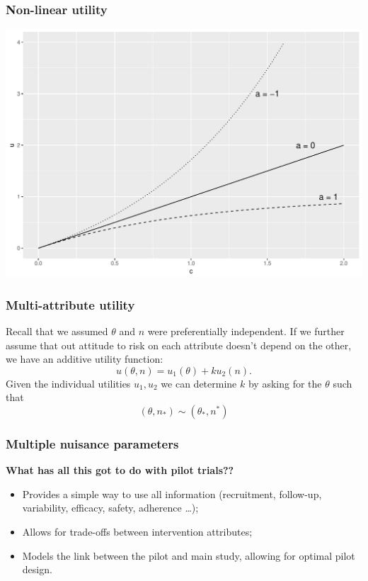 \documentclass{beamer}
\begin{document}
\begin{frame}
\frametitle{Non-linear utility}
\centering
\includegraphics[scale=0.5]{exp_u}
\end{frame}


\begin{frame}
\frametitle{Multi-attribute utility}
Recall that we assumed $\theta$ and $n$ were preferentially independent. If we further assume that out attitude to risk on each attribute doesn't depend on the other, we have an additive utility function:
\begin{equation}
u(\theta, n) = u_{1}(\theta) + ku_{2}(n).
\end{equation}
Given the individual utilities $u_{1}, u_{2}$ we can determine $k$ by asking for the $\theta$ such that
\begin{equation}
(\theta, n_{*}) \sim (\theta_{*}, n^{*})
\end{equation}
\end{frame}

\begin{frame}
\frametitle{Multiple nuisance parameters}
\textbf{What has all this got to do with pilot trials??}

\begin{itemize}
\item Provides a simple way to use all information (recruitment, follow-up, variability, efficacy, safety, adherence \ldots);
\item Allows for trade-offs between intervention attributes;
\item Models the link between the pilot and main study, allowing for optimal pilot design.
\end{itemize}

\end{frame}
\end{document}
